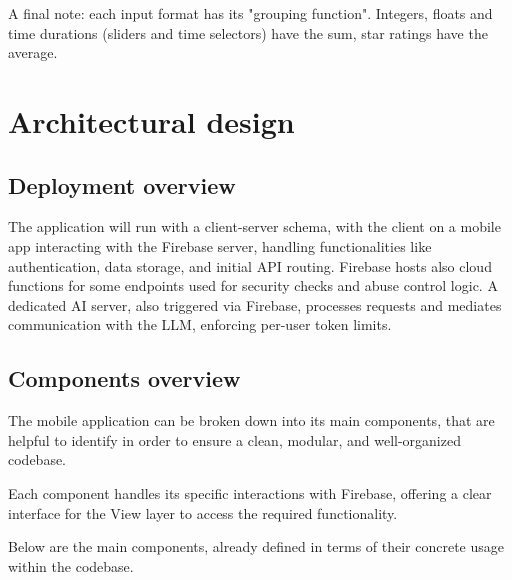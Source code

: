 \documentclass{article}
\begin{document}
A final note: each input format has its "grouping function".
Integers, floats and time durations (sliders and time selectors) have the sum, star ratings have the average.

\newpage
\section{Architectural design}

\subsection{Deployment overview}

The application will run with a client-server schema, with the client on a mobile app interacting with the Firebase server, handling functionalities like authentication, data storage, and initial API routing.
Firebase hosts also cloud functions for some endpoints used for security checks and abuse control logic.
A dedicated AI server, also triggered via Firebase, processes requests and mediates communication with the LLM, enforcing per-user token limits.

\subsection{Components overview}

The mobile application can be broken down into its main components, that are helpful to identify in order to ensure a clean, modular, and well-organized codebase.

Each component handles its specific interactions with Firebase, offering a clear interface for the View layer to access the required functionality.

Below are the main components, already defined in terms of their concrete usage within the codebase.
\end{document}
